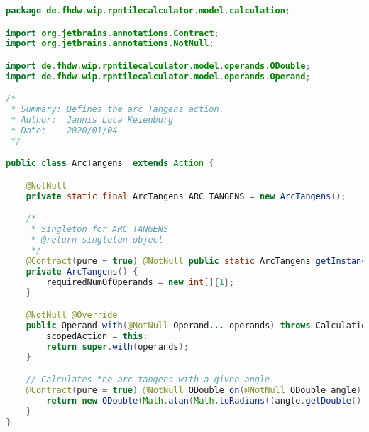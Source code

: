 \begin{lstlisting}[caption=ArcTangens (Keienburg),label=list:ArcTangens,language=Java]
package de.fhdw.wip.rpntilecalculator.model.calculation;

import org.jetbrains.annotations.Contract;
import org.jetbrains.annotations.NotNull;

import de.fhdw.wip.rpntilecalculator.model.operands.ODouble;
import de.fhdw.wip.rpntilecalculator.model.operands.Operand;

/*
 * Summary: Defines the arc Tangens action.
 * Author:  Jannis Luca Keienburg
 * Date:    2020/01/04
 */

public class ArcTangens  extends Action {

    @NotNull
    private static final ArcTangens ARC_TANGENS = new ArcTangens();

    /*
     * Singleton for ARC TANGENS
     * @return singleton object
     */
    @Contract(pure = true) @NotNull public static ArcTangens getInstance() { return ARC_TANGENS; }
    private ArcTangens() {
        requiredNumOfOperands = new int[]{1};
    }

    @NotNull @Override
    public Operand with(@NotNull Operand... operands) throws CalculationException {
        scopedAction = this;
        return super.with(operands);
    }

    // Calculates the arc tangens with a given angle.
    @Contract(pure = true) @NotNull ODouble on(@NotNull ODouble angle) {
        return new ODouble(Math.atan(Math.toRadians((angle.getDouble()))));
    }
}
\end{lstlisting}    

